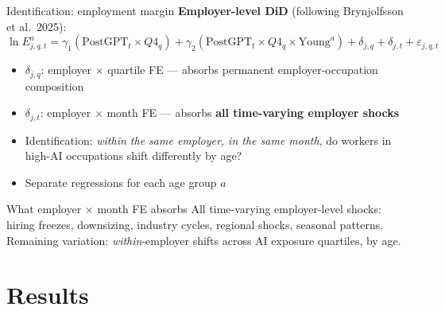\documentclass[aspectratio=169,11pt]{beamer}
\begin{document}
\begin{frame}{Identification: employment margin}
\textbf{Employer-level DiD} (following Brynjolfsson et al.\ 2025):
\vspace{-2mm}
\begin{equation*}
\ln E_{j,q,t}^{a} = \gamma_1 (\text{PostGPT}_t \times Q4_q) + \gamma_2 (\text{PostGPT}_t \times Q4_q \times \text{Young}^a) + \delta_{j,q} + \delta_{j,t} + \varepsilon_{j,q,t}
\end{equation*}

\begin{itemize}
    \item $\delta_{j,q}$: employer $\times$ quartile FE --- absorbs permanent employer-occupation composition
    \item $\delta_{j,t}$: employer $\times$ month FE --- absorbs \textbf{all time-varying employer shocks}
    \item[$\Rightarrow$] Identification: \textit{within the same employer, in the same month}, do workers in high-AI occupations shift differently by age?
    \item Separate regressions for each age group $a$
\end{itemize}
\vspace{2mm}
\begin{alertblock}{What employer $\times$ month FE absorbs}
All time-varying employer-level shocks: hiring freezes, downsizing, industry cycles, regional shocks, seasonal patterns. Remaining variation: \textit{within}-employer shifts across AI exposure quartiles, by age.
\end{alertblock}
\end{frame}

\section{Results}
\end{document}
